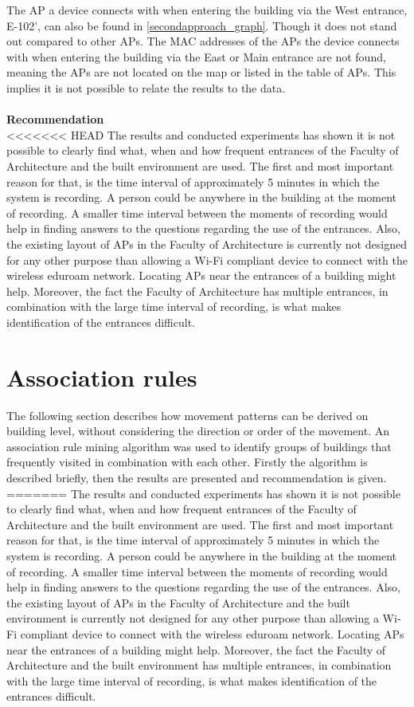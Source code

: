 The AP a device connects with when entering the building via the West entrance, E-102', can also be found in \autoref{secondapproach_graph}. Though it does not stand out compared to other APs. The MAC addresses of the APs the device connects with when entering the building via the East or Main entrance are not found, meaning the APs are not located on the map or listed in the table of APs. This implies it is not possible to relate the results to the data. \\\\
\textbf{Recommendation}\\
<<<<<<< HEAD
The results and conducted experiments has shown it is not possible to clearly find what, when and how frequent entrances of the Faculty of Architecture and the built environment are used. The first and most important reason for that, is the time interval of approximately 5 minutes in which the system is recording. A person could be anywhere in the building at the moment of recording. A smaller time interval between the moments of recording would help in finding answers to the questions regarding the use of the entrances. Also, the existing layout of APs in the Faculty of Architecture is currently not designed for any other purpose than allowing a Wi-Fi compliant device to connect with the wireless eduroam network. Locating APs near the entrances of a building might help. Moreover, the fact the Faculty of Architecture has multiple entrances, in combination with the large time interval of recording, is what makes identification of the entrances difficult. 

\section{Association rules} 
The following section describes how movement patterns can be derived on building level, without considering the direction or order of the movement. An association rule mining algorithm \cite{agrawal_mining_1993} was used to identify groups of buildings that frequently visited in combination with each
other. Firstly the algorithm is described briefly, then the results are presented and recommendation is given.
=======
The results and conducted experiments has shown it is not possible to clearly find what, when and how frequent entrances of the Faculty of Architecture and the built environment are used. The first and most important reason for that, is the time interval of approximately 5 minutes in which the system is recording. A person could be anywhere in the building at the moment of recording. A smaller time interval between the moments of recording would help in finding answers to the questions regarding the use of the entrances. Also, the existing layout of APs in the Faculty of Architecture and the built environment is currently not designed for any other purpose than allowing a Wi-Fi compliant device to connect with the wireless eduroam network. Locating APs near the entrances of a building might help. Moreover, the fact the Faculty of Architecture and the built environment has multiple entrances, in combination with the large time interval of recording, is what makes identification of the entrances difficult. 

